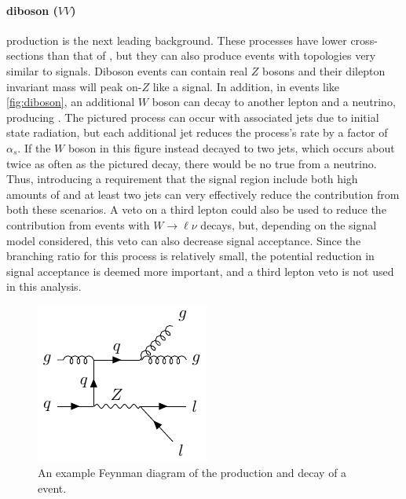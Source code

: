 \paragraph{diboson ($VV$)} production is the next leading background. These processes have lower cross-sections than that of \ttbar, but they can also produce events with topologies very similar to signals. Diboson events can contain real $Z$ bosons and their dilepton invariant mass will peak on-$Z$ like a signal. In addition, in events like \autoref{fig:diboson}, an additional $W$ boson can decay to another lepton and a neutrino, producing \MET. The pictured process can occur with associated jets due to initial state radiation, but each additional jet reduces the process's rate by a factor of $\alpha_s$. If the $W$ boson in this figure instead decayed to two jets, which occurs about twice as often as the pictured decay, there would be no true \MET from a neutrino. Thus, introducing a requirement that the signal region include both high amounts of \MET and at least two jets can very effectively reduce the contribution from both these scenarios. A veto on a third lepton could also be used to reduce the contribution from events with $W\rightarrow \ell \nu$ decays, but, depending on the signal model considered, this veto can also decrease signal acceptance. Since the branching ratio for this process is relatively small, the potential reduction in signal acceptance is deemed more important, and a third lepton veto is not used in this analysis. 

\begin{centering}
\begin{figure}[bth]
\myfloatalign
\includegraphics[width=.70\linewidth]{feynman/zjets.pdf}
\caption{An example Feynman diagram of the production and decay of a \dyjets event.}
\label{fig:zjets}
\end{figure}
\end{centering}

